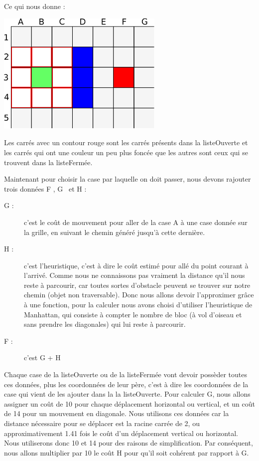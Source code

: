 			
			Ce qui nous donne :
		
			\begin{center}
				\includegraphics[width=8cm]{./Analyse/Img/Grille2.eps}
			\end{center}
		
			Les carrés avec un contour rouge sont les carrés présents dans la
			listeOuverte et les carrés qui ont une couleur un peu plus foncée que les
			autres sont ceux qui se trouvent dans la listeFermée.
		
			Maintenant pour choisir la case par laquelle on doit passer, nous devons rajouter trois données \og F \fg , \og G \fg \, et \og H \fg:
			\begin{description}
				\item[G : ]{c'est le coût de mouvement pour aller de la case A à une case donnée sur la grille, en suivant le chemin généré jusqu'à cette dernière.}
				\item[H :]{c'est l'heuristique, c'est à dire le coût estimé pour allé du point courant à l'arrivé. Comme nous ne connaissons pas vraiment la distance qu'il nous reste à parcourir, car toutes sortes d'obstacle peuvent se trouver sur notre chemin (objet non traversable). Donc nous allons devoir l'approximer grâce à une fonction, pour la calculer nous avons choisi d'utiliser l'heuristique de Manhattan, qui consiste à compter le nombre de bloc (à vol d'oiseau et sans prendre les diagonales) qui lui reste à parcourir.}
				\item[F :]{c'est G + H}
			\end{description} 
		
			Chaque case de la listeOuverte ou de la listeFermée vont devoir possèder toutes ces données, plus les coordonnées de leur père, c'est à dire les coordonnées de la case qui vient de les ajouter dans la la listeOuverte. Pour calculer G, nous allons assigner un coût de 10 pour chaque déplacement horizontal ou vertical, et un coût de 14 pour un mouvement en diagonale. Nous utilisons ces données car la distance nécessaire pour se déplacer est la racine carrée de 2, ou approximativement 1.41 fois le coût d'un déplacement vertical ou horizontal. Nous utiliserons donc 10 et 14 pour des raisons de simplification. Par conséquent, nous allons multiplier par 10 le coût H pour qu'il soit cohérent par rapport à G.
	

